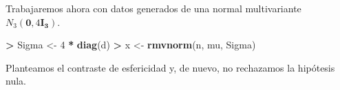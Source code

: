 \documentclass[
  a4paper,
  oneside]{scrbook}
\newenvironment{Shaded}{\begin{snugshade}}{\end{snugshade}}
\newcommand{\DecValTok}[1]{\textcolor[rgb]{0.00,0.00,0.81}{#1}}
\newcommand{\FloatTok}[1]{\textcolor[rgb]{0.00,0.00,0.81}{#1}}
\newcommand{\FunctionTok}[1]{\textcolor[rgb]{0.13,0.29,0.53}{\textbf{#1}}}
\newcommand{\NormalTok}[1]{#1}
\newcommand{\OtherTok}[1]{\textcolor[rgb]{0.56,0.35,0.01}{#1}}
\newcommand{\SpecialCharTok}[1]{\textcolor[rgb]{0.81,0.36,0.00}{\textbf{#1}}}
\theoremstyle{definition}
\theoremstyle{definition}
\theoremstyle{definition}
\theoremstyle{definition}
\theoremstyle{remark}
\begin{document}
\normalsize

Trabajaremos ahora con datos generados de una normal multivariante
\(N_3(\bm{0},4\bm{I_3})\).

\footnotesize

\begin{Shaded}
\begin{Highlighting}[]
\SpecialCharTok{\textgreater{}}\NormalTok{ Sigma }\OtherTok{\textless{}{-}} \DecValTok{4} \SpecialCharTok{*} \FunctionTok{diag}\NormalTok{(d)}
\SpecialCharTok{\textgreater{}}\NormalTok{ x }\OtherTok{\textless{}{-}} \FunctionTok{rmvnorm}\NormalTok{(n, mu, Sigma)}
\end{Highlighting}
\end{Shaded}

\normalsize

Planteamos el contraste de esfericidad y, de nuevo, no rechazamos la
hipótesis nula.

\footnotesize

\begin{Shaded}
\end{Shaded}
\end{document}
